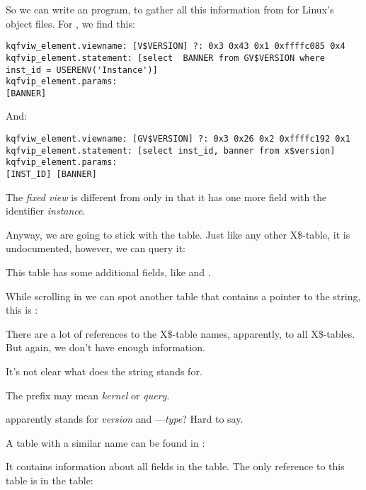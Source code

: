 So we can write an \oracletables program, to gather all this information from \oracle for Linux's object files.
For , we find this:

\begin{lstlisting}[caption=Result of \OracleTablesName]
kqfviw_element.viewname: [V$VERSION] ?: 0x3 0x43 0x1 0xffffc085 0x4
kqfvip_element.statement: [select  BANNER from GV$VERSION where inst_id = USERENV('Instance')]
kqfvip_element.params:
[BANNER] 
\end{lstlisting}

And:

\begin{lstlisting}[caption=Result of \OracleTablesName]
kqfviw_element.viewname: [GV$VERSION] ?: 0x3 0x26 0x2 0xffffc192 0x1
kqfvip_element.statement: [select inst_id, banner from x$version]
kqfvip_element.params:
[INST_ID] [BANNER] 
\end{lstlisting}

The  \emph{fixed view} is different from  only in that it has one more field with the identifier \emph{instance}.

Anyway, we are going to stick with the  table. Just like any other X\$-table, it is undocumented, however, we can query it:



This table has some additional fields, like  and .

While scrolling  in \IDA we can spot another table that contains a pointer to the  string, this is :



There are a lot of references to the X\$-table names, apparently, to all  X\$-tables.
But again, we don't have enough information.

It's not clear what does the  string stands for. 

The  prefix may mean \emph{kernel} or \emph{query}. 

 apparently stands for \emph{version} and ---\emph{type}? 
Hard to say.

A table with a similar name can be found in :



It contains information about all fields in the  table.
The only reference to this table is in the  table:

